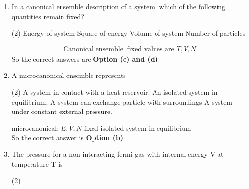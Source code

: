 \begin{enumerate}
\begin{tasks}
		\task[\textbf{a.}]Does not change during evolution to equilibrium.
		\task[\textbf{b.}]Oscillated during evolution to equilibrium .
		\task[\textbf{c.}]Is a maximum in equilibrium .
		\task[\textbf{d.}] Is a minimum in equilibrium .
	\end{tasks}
	\begin{answer}
		\begin{align*}
		E, U, N \rightarrow& \text{ micro canonical ensemble}\\
		S&=K \ln T(E, V, N)\\
		\text{maximum when }&\text{$\Gamma$ is maximum}\\
		\text{In equilibrium } &s \rightarrow\text{ maximum}\\
		\Rightarrow &r \rightarrow \text { maximum }
		\end{align*}
			So the correct answer is \textbf{Option (c)}
	\end{answer}
	\item In a canonical ensemble description of a system, which of the following quantities remain fixed?
	 \begin{tasks}(2)
		\task[\textbf{a.}]Energy of system 
		\task[\textbf{b.}]Square of energy
		\task[\textbf{c.}]Volume of system
		\task[\textbf{d.}] Number of particles
	\end{tasks}
	\begin{answer}
		\begin{align*}
		\text{Canonical ensemble:
		fixed values are }T, V, N
		\end{align*}
		So the correct answers are \textbf{Option (c) and (d)}
	\end{answer}
	\item A microcanonical ensemble represents
	 \begin{tasks}(2)
		\task[\textbf{a.}]A system in contact with a heat reservoir.
		\task[\textbf{b.}]An isolated system in equilibrium.
		\task[\textbf{c.}]A system can exchange particle with surroundings
		\task[\textbf{d.}]A system under constant external pressure. 
	\end{tasks}
	\begin{answer}
		microcanonical: $E, V, N$ fixed isolated system in equilibrium\\
			So the correct answer is \textbf{Option (b)}
	\end{answer}
	\item The pressure for a non interacting fermi gas with internal energy V at temperature T is 
	 \begin{tasks}(2)

\end{tasks}
\end{enumerate}
